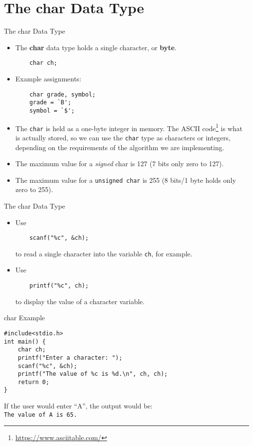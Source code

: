 \documentclass[graphics]{beamer}
\begin{document}
\section{The char Data Type}
\begin{frame}[fragile]{The char Data Type}
    \begin{itemize}
        \item The \textbf{char} data type holds a single character, or \textbf{byte}.
        \begin{verbatim}
    char ch;
        \end{verbatim}
        \item Example assignments:
        \begin{verbatim}
    char grade, symbol;
    grade = `B';
    symbol = `$';
        \end{verbatim}
        \item The \texttt{char} is held as a one-byte integer in memory. The ASCII code\footnote{\url{https://www.asciitable.com/}} is what is actually stored, so we can use the \texttt{char} type as characters or integers, depending on the requirements of the algorithm we are implementing.
        \item The maximum value for a \textit{signed} char is 127 (7 bits only zero to 127).
        \item The maximum value for a \texttt{unsigned char} is 255 (8 bits/1 byte holds only zero to 255).
    \end{itemize}
\end{frame}

\begin{frame}[fragile]{The char Data Type}
    \begin{itemize}
        \item Use
        \begin{verbatim}
    scanf("%c", &ch);
        \end{verbatim}
        to read a single character into the variable \texttt{ch}, for example.
        \item Use
        \begin{verbatim}
    printf("%c", ch);
        \end{verbatim}
        to display the value of a character variable.
    \end{itemize}
\end{frame}

\begin{frame}[fragile]{char Example}
    \begin{verbatim}
#include<stdio.h>
int main() {
    char ch;
    printf("Enter a character: ");
    scanf("%c", &ch);
    printf("The value of %c is %d.\n", ch, ch);
    return 0;
}
    \end{verbatim}
    If the user would enter ``A'', the output would be: \\
    \texttt{The value of A is 65.}
\end{frame}
\end{document}
